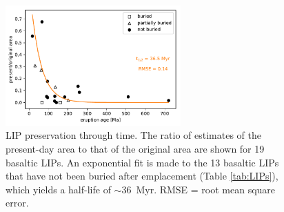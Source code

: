 \documentclass[11pt,letterpaper]{article}
\begin{document}
\begin{figure}[h!]
\begin{center}
	\includegraphics[width=0.6\textwidth]{Manuscript/Figures/LIP_Preservation.pdf}
	\caption{LIP preservation through time. The ratio of estimates of the present-day area to that of the original area are shown for 19 basaltic LIPs. An exponential fit is made to the 13 basaltic LIPs that have not been buried after emplacement (Table \ref{tab:LIPs}), which yields a half-life of $\sim$36~Myr. RMSE = root mean square error.}
	\label{fig:LIP_preservation}
\end{center}
\end{figure}
\end{document}

